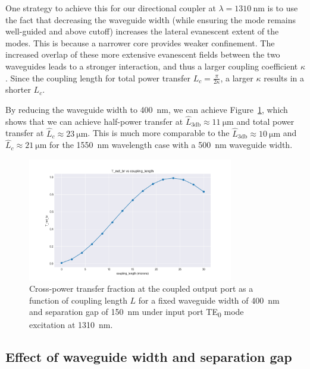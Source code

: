 \documentclass[10pt, a4paper]{article}
\begin{document}
One strategy to achieve this for our directional coupler at \(\lambda=\SI{1310}{\nm}\) is to use the fact that decreasing the waveguide width (while ensuring the mode remains well-guided and above cutoff) increases the lateral evanescent extent of the modes.
This is because a narrower core provides weaker confinement. The increased overlap of these more extensive evanescent fields between the two waveguides leads to a stronger interaction, and thus a larger coupling coefficient \(\kappa\). Since the coupling length for total power transfer \(L_c = \frac{\pi}{2\kappa}\), a larger \(\kappa\) results in a shorter \(L_c\).

By reducing the waveguide width to \SI{400}{\nm}, we can achieve Figure~\ref{fig:coupling_length_1310_w400},
which shows that we can achieve half-power transfer at \(\hat{L}_{3\text{db}}\approx\SI{11}{\um}\) and total power transfer at \(\hat{L}_c\approx\SI{23}{\um}\). This is much more comparable to the \(\hat{L}_{3\text{db}}\approx\SI{10}{\um}\) and \(\hat{L}_c\approx\SI{21}{\um}\) for the \SI{1550}{\nm} wavelength case with a \SI{500}{\nm} waveguide width.

\begin{figure}[h!]
  \centering
  \includegraphics[width=0.8\textwidth]{task3/sweep_plots/sweep_idx_6_sweep__coupling_length=0_30_15_wg1_width=0.4_wg2_width=0.4_separation=0.15_center_wavelength=1.31_T_net_br_line.png}
  \caption{Cross-power transfer fraction at the coupled output port as a function of coupling length \(L\) for a fixed waveguide width of \SI{400}{\nm} and separation gap of \SI{150}{\nm} under input port TE\textsubscript{0} mode excitation at \SI{1310}{\nm}.}
  \label{fig:coupling_length_1310_w400}
\end{figure}

\subsection{Effect of waveguide width and separation gap}
\end{document}
